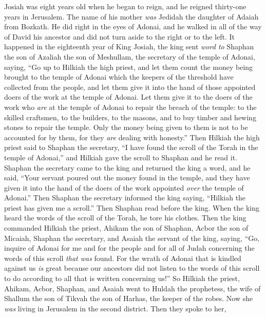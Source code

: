 \begin{biblechapter} %
 Josiah was eight years old when he began to reign, and he reigned thirty-one years in Jerusalem. The name of his mother \textit{was} Jedidah the daughter of Adaiah from Bozkath.
\verse He did right in the eyes of Adonai, and he walked in all of the way of David his ancestor and did not turn aside to the right or to the left.
\verse It happened in the eighteenth year of King Josiah, the king sent \textit{word to} Shaphan the son of Azaliah the son of Meshullam, the secretary of the temple of Adonai, saying,
\verse “Go up to Hilkiah the high priest, and let them count the money being brought to the temple of Adonai which the keepers of the threshold have collected from the people,
\verse and let them give it into the hand of those appointed doers of the work at the temple of Adonai. Let them give it to the doers of the work who \textit{are} at the temple of Adonai to repair the breach of the temple:
\verse to the skilled craftsmen, to the builders, to the masons, and to buy timber and hewing stones to repair the temple.
\verse Only the money being given to them is not to be accounted for by them, for they \textit{are} dealing with honesty.”
 Then Hilkiah the high priest said to Shaphan the secretary, “I have found the scroll of the Torah in the temple of Adonai,” and Hilkiah gave the scroll to Shaphan and he read it.
\verse Shaphan the secretary came to the king and returned the king a word, and he said, “Your servant poured out the money found in the temple, and they have given it into the hand of the doers of the work appointed \textit{over} the temple of Adonai.”
\verse Then Shaphan the secretary informed the king saying, “Hilkiah the priest has given me a scroll.” Then Shaphan read before the king.
\verse When the king heard the words of the scroll of the Torah, he tore his clothes.
\verse Then the king commanded Hilkiah the priest, Ahikam the son of Shaphan, Acbor the son of Micaiah, Shaphan the secretary, and Asaiah the servant of the king, saying,
\verse “Go, inquire of Adonai for me and for the people and for all of Judah concerning the words of this scroll \textit{that was} found. For the wrath of Adonai that is kindled against us \textit{is} great because our ancestors did not listen to the words of this scroll to do according to all that is written concerning us!”
 So Hilkiah the priest, Ahikam, Acbor, Shaphan, and Asaiah went to Huldah the prophetess, the wife of Shallum the son of Tikvah the son of Harhas, the keeper of the robes. Now she \textit{was} living in Jerusalem in the second district. Then they spoke to her,

\end{biblechapter}
